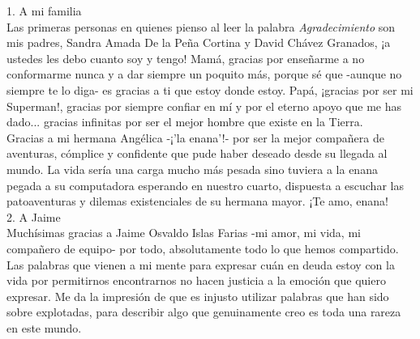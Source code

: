 \documentclass[
12pt, %
spanish, %
singlespacing, %
headsepline, %
]{MastersDoctoralThesis} %
\begin{document}

\begin{acknowledgements}
\addchaptertocentry{\acknowledgementname} %

1. A mi familia\\

Las primeras personas en quienes pienso al leer la palabra \textit{Agradecimiento} son mis padres, Sandra Amada De la Peña Cortina y David Chávez Granados, ¡a ustedes les debo cuanto soy y tengo! Mamá, gracias por enseñarme a no conformarme nunca y a dar siempre un poquito más, porque sé que -aunque no siempre te lo diga- es gracias a ti que estoy donde estoy. Papá, ¡gracias por ser mi Superman!, gracias por siempre confiar en mí y por el eterno apoyo que me has dado... gracias infinitas por ser el mejor hombre que existe en la Tierra.\\

Gracias a mi hermana Angélica -¡'la enana'!- por ser la mejor compañera de aventuras, cómplice y confidente que pude haber deseado desde su llegada al mundo. La vida sería una carga mucho más pesada sino tuviera a la enana pegada a su computadora esperando en nuestro cuarto, dispuesta a escuchar las patoaventuras y dilemas existenciales de su hermana mayor. ¡Te amo, enana!\\


2. A Jaime\\

Muchísimas gracias a Jaime Osvaldo Islas Farias -mi amor, mi vida, mi compañero de equipo- por todo, absolutamente todo lo que hemos compartido. Las palabras que vienen a mi mente para expresar cuán en deuda estoy con la vida por permitirnos encontrarnos no hacen justicia a la emoción que quiero expresar. Me da la impresión de que es injusto utilizar palabras que han sido sobre explotadas, para describir algo que genuinamente creo es toda una rareza en este mundo.\\


\end{acknowledgements}
\end{document}

